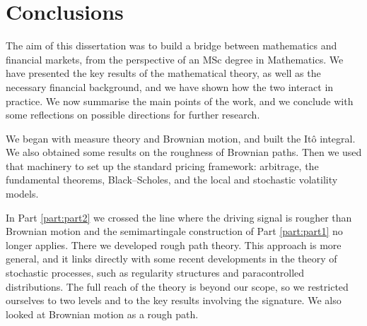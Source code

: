 %
\chapter*{Conclusions} \label{ch:conclusions}

The aim of this dissertation was to build a bridge between mathematics and financial markets, from the perspective of an MSc degree in Mathematics. We have presented the key results of the mathematical theory, as well as the necessary financial background, and we have shown how the two interact in practice. We now summarise the main points of the work, and we conclude with some reflections on possible directions for further research.

We began with measure theory and
Brownian motion, and built the Itô integral. We also obtained some results on the roughness of
Brownian paths. Then we used that machinery to set up the standard pricing framework:
arbitrage, the fundamental theorems, Black--Scholes, and the local and stochastic volatility models.

In Part \ref{part:part2} we crossed the line where the driving
signal is rougher than Brownian motion and the semimartingale construction of Part \ref{part:part1}
no longer applies. There we developed
rough path theory. This approach is more general, and it links directly with some recent developments
in the theory of stochastic processes, such as regularity structures and paracontrolled
distributions. The full reach of the theory is beyond our scope, so we restricted ourselves to two
levels and to the key results involving the signature. We also looked at Brownian motion as a rough
path.

